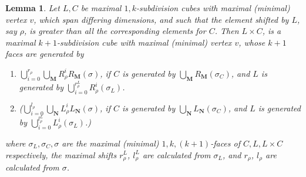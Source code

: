 \documentclass{amsart}
\newtheorem{lemma}[theorem]{Lemma}
\theoremstyle{definition}
\begin{document}
\begin{lemma}\label{lem:product of line and cube shift desc}
Let $L,C$ be maximal $1,k$-subdivision cubes with maximal (minimal) vertex $v$, which span differing dimensions, and such that the element shifted by $L$, say $\rho$, is greater than all the corresponding elements for $C$.
Then $L\times C$, is a maximal $k+1$-subdivision cube with maximal (minimal) vertex $v$, whose $k+1$ faces are generated by
\begin{enumerate}
    \item $\bigcup_{i=0}^{r_\rho}\bigcup_\mathbf{M} R_\rho^i R_\mathbf{M}(\sigma)$, if $C$ is generated by $\bigcup_\mathbf{M} R_\mathbf{M}(\sigma_C)$, and $L$ is generated by $\bigcup_{i=0}^{r_\rho^L}R_\rho^i (\sigma_L)$.
    \item ($\bigcup_{i=0}^{l_\rho}\bigcup_\mathbf{N} L_\rho^i L_\mathbf{N}(\sigma)$, if $C$ is generated by $\bigcup_\mathbf{N} L_\mathbf{N}(\sigma_C)$, and $L$ is generated by $\bigcup_{i=0}^{l_\rho^L}L_\rho^i (\sigma_L)$.)
\end{enumerate}
where $\sigma_L,\sigma_C,\sigma$ are the maximal (minimal) $1,k,(k+1)$-faces of $C,L,L\times C$ respectively, the maximal shifts $r_\rho^L$, $l_\rho^L$ are calculated from $\sigma_L$, and $r_\rho$, $l_\rho$ are calculated from $\sigma$.
\end{lemma}
\end{document}
